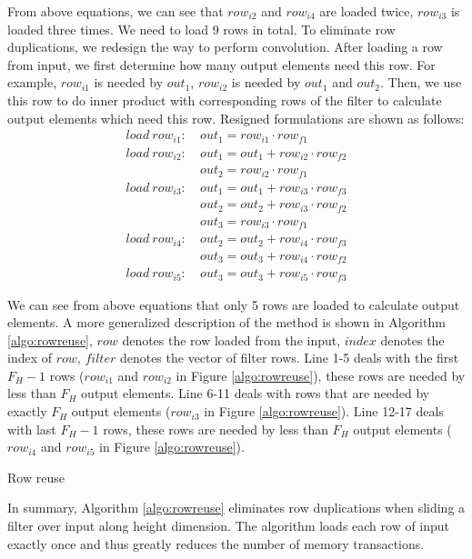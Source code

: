 From above equations, we can see that $row_{i2}$ and $row_{i4}$ are loaded twice, $row_{i3}$ is loaded three times. We need to load 9 rows
in total. To eliminate row duplications, we redesign the way to perform convolution. After loading a row from input, we first determine how
many output elements need this row. For example, $row_{i1}$ is needed by $out_1$, $row_{i2}$ is needed by $out_1$ and $out_2$. Then, we use
this row to do inner product with corresponding rows of the filter to calculate output elements which need this row. Resigned formulations
are shown as follows:
\begin{equation}\nonumber
\begin{aligned}
load\ row_{i1}:
&\ out_1=row_{i1} \cdot row_{f1} \\
load\ row_{i2}:
&\ out_1 = out_1+row_{i2} \cdot row_{f2}\\
&\ out_2=row_{i2} \cdot row_{f1}\\
load\ row_{i3}:
&\ out_1 = out_1+row_{i3} \cdot row_{f3}\\
&\ out_2 = out_2+row_{i3} \cdot row_{f2}\\
&\ out_{3}=row_{i3} \cdot row_{f1}\\
load\ row_{i4}:
&\ out_2=out_2+row_{i4} \cdot row_{f3} \\
&\ out_3=out_3+row_{i4} \cdot row_{f2}\\
load\ row_{i5}:
&\ out_3=out_3+row_{i5} \cdot row_{f3}
\end{aligned}	
\end{equation}



We can see from above equations that only 5 rows are loaded to calculate output elements. A more generalized description of the method is
shown in Algorithm \ref{algo:rowreuse}, $row$ denotes the row loaded from the input, $index$ denotes the index of $row$, $filter$ denotes
the vector of filter rows. Line 1-5 deals with the first $F_H-1$ rows ($row_{i1}$ and $row_{i2}$ in Figure \ref{algo:rowreuse}), these rows
are needed by less than $F_H$ output elements. Line 6-11 deals with rows that are needed by exactly $F_H$ output elements ($row_{i3}$ in
Figure \ref{algo:rowreuse}). Line 12-17 deals with last $F_H-1$ rows, these rows are needed by less than $F_H$ output elements ($row_{i4}$
and $row_{i5}$ in Figure \ref{algo:rowreuse}).

\begin{algorithm}
	\caption{Row reuse}
	\label{algo:rowreuse}
\end{algorithm}

In summary, Algorithm \ref{algo:rowreuse} eliminates row duplications when sliding a filter over input along height dimension. The
algorithm loads each row of input exactly once and thus greatly reduces the number of memory transactions.
